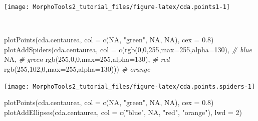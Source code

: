 \documentclass[
  11pt,
  a4paper]{article}
\newenvironment{Shaded}{\begin{snugshade}}{\end{snugshade}}
\newcommand{\AttributeTok}[1]{\textcolor[rgb]{0.77,0.63,0.00}{#1}}
\newcommand{\CommentTok}[1]{\textcolor[rgb]{0.56,0.35,0.01}{\textit{#1}}}
\newcommand{\ConstantTok}[1]{\textcolor[rgb]{0.00,0.00,0.00}{#1}}
\newcommand{\DecValTok}[1]{\textcolor[rgb]{0.00,0.00,0.81}{#1}}
\newcommand{\FloatTok}[1]{\textcolor[rgb]{0.00,0.00,0.81}{#1}}
\newcommand{\FunctionTok}[1]{\textcolor[rgb]{0.00,0.00,0.00}{#1}}
\newcommand{\NormalTok}[1]{#1}
\newcommand{\StringTok}[1]{\textcolor[rgb]{0.31,0.60,0.02}{#1}}
\begin{document}
\begin{center}\texttt{[image: MorphoTools2\_tutorial\_files/figure-latex/cda.points1-1]} \end{center}

~\\
\hspace*{0.333em}

\begin{Shaded}
\begin{Highlighting}[]
\FunctionTok{plotPoints}\NormalTok{(cda.centaurea, }\AttributeTok{col =} \FunctionTok{c}\NormalTok{(}\ConstantTok{NA}\NormalTok{, }\StringTok{"green"}\NormalTok{, }\ConstantTok{NA}\NormalTok{, }\ConstantTok{NA}\NormalTok{), }\AttributeTok{cex =} \FloatTok{0.8}\NormalTok{)}
\FunctionTok{plotAddSpiders}\NormalTok{(cda.centaurea, }\AttributeTok{col =} \FunctionTok{c}\NormalTok{(}\FunctionTok{rgb}\NormalTok{(}\DecValTok{0}\NormalTok{,}\DecValTok{0}\NormalTok{,}\DecValTok{255}\NormalTok{,}\AttributeTok{max=}\DecValTok{255}\NormalTok{,}\AttributeTok{alpha=}\DecValTok{130}\NormalTok{), }\CommentTok{\# blue}
                                      \ConstantTok{NA}\NormalTok{, }\CommentTok{\# green}
                                      \FunctionTok{rgb}\NormalTok{(}\DecValTok{255}\NormalTok{,}\DecValTok{0}\NormalTok{,}\DecValTok{0}\NormalTok{,}\AttributeTok{max=}\DecValTok{255}\NormalTok{,}\AttributeTok{alpha=}\DecValTok{130}\NormalTok{), }\CommentTok{\# red}
                                      \FunctionTok{rgb}\NormalTok{(}\DecValTok{255}\NormalTok{,}\DecValTok{102}\NormalTok{,}\DecValTok{0}\NormalTok{,}\AttributeTok{max=}\DecValTok{255}\NormalTok{,}\AttributeTok{alpha=}\DecValTok{130}\NormalTok{))) }\CommentTok{\# orange}
\end{Highlighting}
\end{Shaded}

\begin{center}\texttt{[image: MorphoTools2\_tutorial\_files/figure-latex/cda.points.spiders-1]} \end{center}

\newpage

\begin{Shaded}
\begin{Highlighting}[]
\FunctionTok{plotPoints}\NormalTok{(cda.centaurea, }\AttributeTok{col =} \FunctionTok{c}\NormalTok{(}\ConstantTok{NA}\NormalTok{, }\StringTok{"green"}\NormalTok{, }\ConstantTok{NA}\NormalTok{, }\ConstantTok{NA}\NormalTok{), }\AttributeTok{cex =} \FloatTok{0.8}\NormalTok{)}
\FunctionTok{plotAddEllipses}\NormalTok{(cda.centaurea, }\AttributeTok{col =} \FunctionTok{c}\NormalTok{(}\StringTok{"blue"}\NormalTok{, }\ConstantTok{NA}\NormalTok{, }\StringTok{"red"}\NormalTok{, }\StringTok{"orange"}\NormalTok{), }\AttributeTok{lwd =} \DecValTok{2}\NormalTok{)}
\end{Highlighting}
\end{Shaded}
\end{document}
